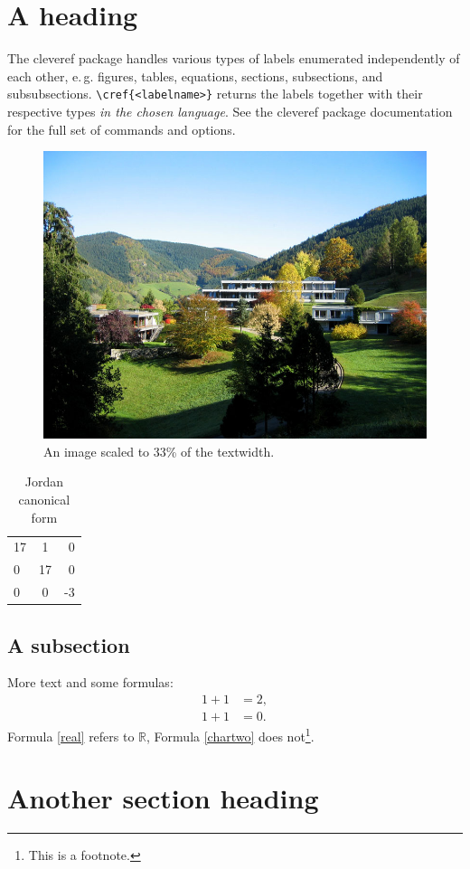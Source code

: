 \documentclass{snapshotmfo}
\begin{document}
\section{A heading}
\label{sec.heading}
The cleveref package handles various types of labels enumerated independently of each other, e.\,g.
figures, tables, equations, sections, subsections, and subsubsections.
\verb+\cref{<labelname>}+ returns the labels together with their respective types {\em in the chosen language}.
See the cleveref package documentation for the full set of commands and options.

\begin{figure}[ht]
	\centering
	\includegraphics[width= 0.33 \textwidth]{mfo.jpg}
	\caption{An image scaled to 33\% of the textwidth.}
	\label{fig.Institute}
\end{figure}

\begin{table}[ht]
	\caption{Jordan canonical form}
	\begin{tabular}{ l c r }
		17 & 1 & 0 \\
		0 & 17 & 0 \\
		0 & 0 & -3 \\
	\end{tabular}
	\label{tab.Jordan}
\end{table}

\subsection{A subsection}
\label{subsec.first}
More text and some formulas:
\begin{align}\label{real}
	1+1&=2,\\\label{chartwo}
	1+1&=0.
\end{align}
Formula \eqref{real} refers to $\mathbb{R}$, Formula \eqref{chartwo} does not\footnote{This is a footnote.\label{footnote}}.


\section{Another section heading}
\label{sec.another}
\end{document}
